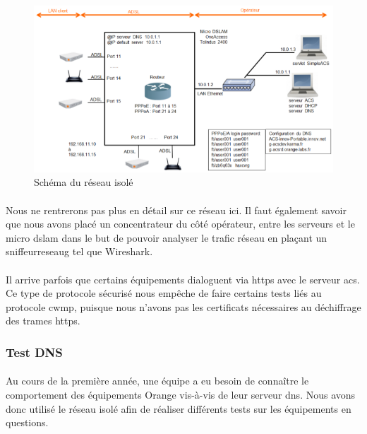 \documentclass[12pt,a4paper]{report}
\begin{document}
\paragraph*{}
\begin{figure}[!ht]
    \center
    \includegraphics[scale=0.7]{./img/reseau_isole.png}
    \caption{Schéma du réseau isolé}
\end{figure}
\paragraph*{}Nous ne rentrerons pas plus en détail sur ce réseau ici. Il faut également savoir que nous avons placé un concentrateur du côté opérateur, entre les serveurs et le micro \gls{dslam} dans le but de pouvoir analyser le trafic réseau en plaçant un \gls{sniffeurreseaug} tel que Wireshark. 
\paragraph*{}Il arrive parfois que certains équipements dialoguent via \gls{https} avec le serveur \gls{acs}. Ce type de protocole sécurisé nous empêche de faire certains tests liés au protocole \gls{cwmp}, puisque nous n’avons pas les certificats nécessaires au déchiffrage des trames \gls{https}. \\
\subsubsection{Test DNS}
\paragraph*{}Au cours de la première année, une équipe a eu besoin de connaître le comportement des équipements Orange vis-à-vis de leur serveur \gls{dns}. Nous avons donc utilisé le réseau isolé afin de réaliser différents tests sur les équipements en questions.
\end{document}
